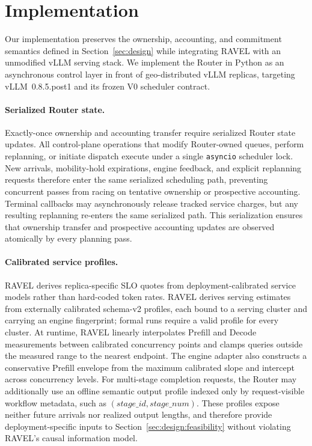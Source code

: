 \section{Implementation}
\label{sec:implementation}

Our implementation preserves the ownership, accounting, and commitment
semantics defined in Section~\ref{sec:design} while integrating RAVEL with an
unmodified vLLM serving stack.
We implement the Router in Python as an asynchronous control layer in front of
geo-distributed vLLM replicas, targeting vLLM~0.8.5.post1 and its frozen V0
scheduler contract.

\paragraph{Serialized Router state.}
Exactly-once ownership and accounting transfer require serialized Router state
updates.
All control-plane operations that modify Router-owned queues, perform
replanning, or initiate dispatch execute under a single \texttt{asyncio}
scheduler lock.
New arrivals, mobility-hold expirations, engine feedback, and explicit
replanning requests therefore enter the same serialized scheduling path,
preventing concurrent passes from racing on tentative ownership or prospective
accounting.
Terminal callbacks may asynchronously release tracked service charges, but any
resulting replanning re-enters the same serialized path.
This serialization ensures that ownership transfer and prospective accounting
updates are observed atomically by every planning pass.

\paragraph{Calibrated service profiles.}
RAVEL derives replica-specific SLO quotes from deployment-calibrated service
models rather than hard-coded token rates.
RAVEL derives serving estimates from externally calibrated schema-v2 profiles,
each bound to a serving cluster and carrying an engine fingerprint; formal runs
require a valid profile for every cluster.
At runtime, RAVEL linearly interpolates Prefill and Decode measurements between
calibrated concurrency points and clamps queries outside the measured range to
the nearest endpoint.
The engine adapter also constructs a conservative Prefill envelope from the
maximum calibrated slope and intercept across concurrency levels.
For multi-stage completion requests, the Router may additionally use an offline
semantic output profile indexed only by request-visible workflow metadata, such
as $(\textit{stage\_id},\textit{stage\_num})$.
These profiles expose neither future arrivals nor realized output lengths, and
therefore provide deployment-specific inputs to
Section~\ref{sec:design:feasibility} without violating RAVEL's causal
information model.

